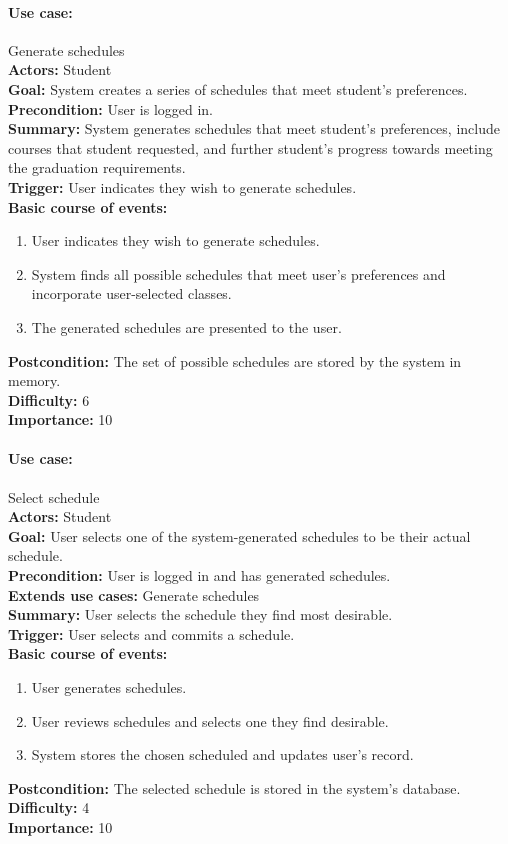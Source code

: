\documentclass[12pt]{article}
\begin{document}
\paragraph*{Use case:} Generate schedules\\
\textbf{Actors:} Student\\
\textbf{Goal:} System creates a series of schedules that meet student's preferences.\\
\textbf{Precondition:} User is logged in.\\
\textbf{Summary:} System generates schedules that meet student's preferences, include courses that student requested, and further student's progress towards meeting the graduation requirements. \\
\textbf{Trigger:} User indicates they wish to generate schedules.\\
\textbf{Basic course of events:}
\begin{enumerate}
\item User indicates they wish to generate schedules.
\item System finds all possible schedules that meet user's preferences and incorporate user-selected classes.
\item The generated schedules are presented to the user.
\end{enumerate}
\textbf{Postcondition:} The set of possible schedules are stored by the system in memory.\\
\textbf{Difficulty:} 6\\
\textbf{Importance:} 10\\


\paragraph*{Use case:} Select schedule\\
\textbf{Actors:} Student\\
\textbf{Goal:} User selects one of the system-generated schedules to be their actual schedule.\\
\textbf{Precondition:} User is logged in and has generated schedules.\\
\textbf{Extends use cases:} Generate schedules\\
\textbf{Summary:} User selects the schedule they find most desirable.\\
\textbf{Trigger:} User selects and commits a schedule.\\
\textbf{Basic course of events:}
\begin{enumerate}
\item User generates schedules.
\item User reviews schedules and selects one they find desirable.
\item System stores the chosen scheduled and updates user's record.
\end{enumerate}
\textbf{Postcondition:} The selected schedule is stored in the system's database.\\
\textbf{Difficulty:} 4\\
\textbf{Importance:} 10\\
\end{document}
